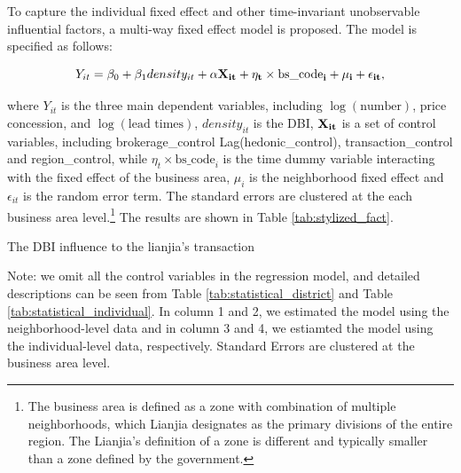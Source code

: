 \documentclass[11pt]{article}
\begin{document}
To capture the individual fixed effect and other time-invariant unobservable influential factors, a multi-way fixed effect model is proposed. The model is specified as follows: 

\begin{equation}
  Y_{it} = \beta_0 + \beta_1 density_{it} + \bf{\alpha} \bf{X}_{it} + \eta_{t} \times \text{bs\_code}_i + \mu_i + \epsilon_{it}, \label{eq:multi-way-fe}
\end{equation}

where $Y_{it}$ is the three main dependent variables, including $\log(\text{number})$, price concession, and $\log(\text{lead times})$, $density_{it}$ is the DBI, $\bf{X}_{it}$ is a set of control variables, including brokerage\_control Lag(hedonic\_control), transaction\_control and region\_control, while $\eta_{t} \times \text{bs\_code}_i$ is the time dummy variable interacting with the fixed effect of the business area, $\mu_i$ is the neighborhood fixed effect and $\epsilon_{it}$ is the random error term. The standard errors are clustered at the each business area level.\footnote{The business area is defined as a zone with combination of multiple neighborhoods, which Lianjia designates as the primary divisions of the entire region. The Lianjia's definition of a zone is different and typically smaller than a zone defined by the government.} The results are shown in Table \ref{tab:stylized_fact}.

\begin{table}[htb!]
    \centering
    \begin{scriptsize}
    
    \caption{The DBI influence to the lianjia's transaction}

    Note: we omit all the control variables in the regression model, and detailed descriptions can be seen from Table \ref{tab:statistical_district} and Table \ref{tab:statistical_individual}. In column 1 and 2, we estimated the model using the neighborhood-level data and in column 3 and 4, we estiamted the model using the individual-level data, respectively. Standard Errors are clustered at the business area level.
    \label{tab:stylized_fact}
    \end{scriptsize}
\end{table}
\end{document}

